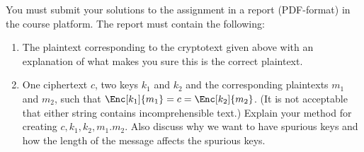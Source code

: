 \documentclass[a4paper]{llncs}
\begin{document}
You must submit your solutions to the assignment in a report (PDF-format) in 
the course platform.
The report must contain the following:
\begin{enumerate}
  \item The plaintext corresponding to the cryptotext given above with an 
    explanation of what makes you sure this is the correct plaintext.


  \item One ciphertext \(c\), two keys \(k_1\) and \(k_2\) and the 
    corresponding plaintexts \(m_1\) and \(m_2\), such that \(\Enc[k_1]{m_1} 
      = c = \Enc[k_2]{m_2}\).
    (It is not acceptable that either string contains incomprehensible text.)
    Explain your method for creating \(c, k_1, k_2, m_1. m_2\).
    Also discuss why we want to have spurious keys and how the length of the 
    message affects the spurious keys.

\end{enumerate}


\printbibliography{}
\end{document}
